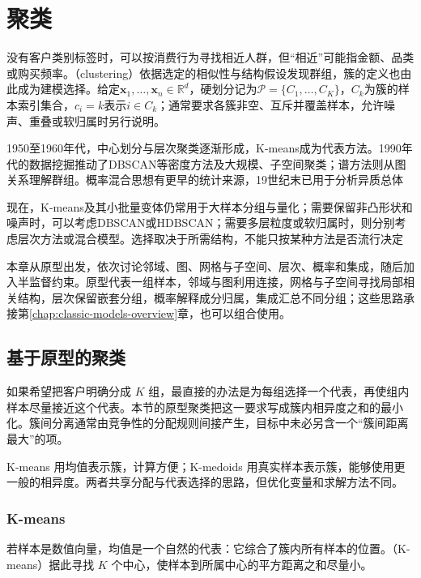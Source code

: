 \chapter{聚类}
\label{chap:clustering}

没有客户类别标签时，可以按消费行为寻找相近人群，但“相近”可能指金额、品类或购买频率。（clustering）依据选定的相似性与结构假设发现群组，簇的定义也由此成为建模选择。给定$\bm{x}_1,\ldots,\bm{x}_n\in\mathbb{R}^{d}$，硬划分记为$\mathcal{P}=\{C_1,\ldots,C_K\}$，$C_k$为簇的样本索引集合，$c_i=k$表示$i\in C_k$；通常要求各簇非空、互斥并覆盖样本，允许噪声、重叠或软归属时另行说明。

1950至1960年代，中心划分与层次聚类逐渐形成，K-means成为代表方法。1990年代的数据挖掘推动了DBSCAN等密度方法及大规模、子空间聚类；谱方法则从图关系理解群组。概率混合思想有更早的统计来源，19世纪末已用于分析异质总体

现在，K-means及其小批量变体仍常用于大样本分组与量化；需要保留非凸形状和噪声时，可以考虑DBSCAN或HDBSCAN；需要多层粒度或软归属时，则分别考虑层次方法或混合模型。选择取决于所需结构，不能只按某种方法是否流行决定

本章从原型出发，依次讨论邻域、图、网格与子空间、层次、概率和集成，随后加入半监督约束。原型代表一组样本，邻域与图利用连接，网格与子空间寻找局部相关结构，层次保留嵌套分组，概率解释成分归属，集成汇总不同分组；这些思路承接第\ref{chap:classic-models-overview}章，也可以组合使用。

\section{基于原型的聚类}
\label{sec:clustering-partition}

如果希望把客户明确分成 $K$ 组，最直接的办法是为每组选择一个代表，再使组内样本尽量接近这个代表。本节的原型聚类把这一要求写成簇内相异度之和的最小化。簇间分离通常由竞争性的分配规则间接产生，目标中未必另含一个“簇间距离最大”的项。

K-means 用均值表示簇，计算方便；K-medoids 用真实样本表示簇，能够使用更一般的相异度。两者共享分配与代表选择的思路，但优化变量和求解方法不同。

\subsection{K-means}
\label{sec:clustering-kmeans}

若样本是数值向量，均值是一个自然的代表：它综合了簇内所有样本的位置。（K-means）据此寻找 $K$ 个中心，使样本到所属中心的平方距离之和尽量小。

